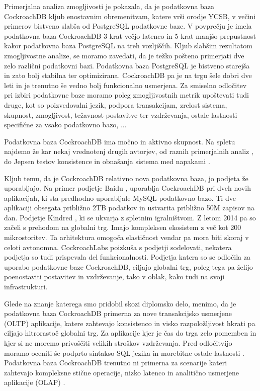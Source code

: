 \documentclass[a4paper, 12pt]{book}
\begin{document}
Primerjalna analiza zmogljivosti je pokazala, da je podatkovna baza Cock\-roachDB kljub enostavnim obremenitvam, katere vrši orodje YCSB, v večini primerov bistveno slabša od PostgreSQL podatkovne baze. V povprečju je imela podatkovna baza Cock\-roachDB 3 krat večjo latenco in 5 krat manjšo prepustnost kakor podatkovna baza PostgreSQL na treh vozljiščih.
Kljub slabšim rezultatom zmogljivostne analize, se moramo zavedati, da je težko pošteno primerjati dve zelo različni podatkovni bazi. Podatkovna baza PostgreSQL je bistveno starejša in zato bolj stabilna ter optimizirana. CockroachDB pa je na trgu šele dobri dve leti in je trenutno še vedno bolj funkcionalno usmerjena. Za smiselno odločitev pri izbiri podatkovne baze moramo poleg zmogljivostnih metrik upoštevati tudi druge, kot so poizvedovalni jezik, podpora transakcijam, zrelost sistema, skupnost, zmogljivost, težavnost postavitve ter vzdrževanja, ostale lastnosti specifične za vsako podatkovno bazo, ...

Podatkovna baza CockroachDB ima močno in aktivno skupnost. Na spletu najdemo že kar nekaj vrednotenj drugih avtorjev, od raznih primerjalnih analiz \cite{kaur2017performance, Benchmarking-GCS-CRDB-NuoDB, CRDB-tpcc-vs-aurora, CRDB-2017}, do Jepsen testov konsistence in obnašanja sistema med napakami \cite{CRDB-jepsen, CRDB-jepsen-diy}.

Kljub temu, da je CockroachDB relativno nova podatkovna baza, jo podjeta že uporabljajo. Na primer podjetje Baidu \cite{crdb-baidu}, uporablja CockroachDB pri dveh novih aplikacijah, ki sta predhodno uporabljale MySQL podatkovno bazo. Ti dve aplikaciji obsegata približno 2TB podatkov in ustvarita približno 50M zapisov na dan. Podjetje Kindred \cite{crdb-kindred}, ki se ukvarja z spletnim igralništvom. Z letom 2014 pa so začeli s prehodom na globalni trg. Imajo kompleksen ekosistem z več kot 200 mikrostoritev. Ta arhitektura omogoča elastičnost vendar pa mora biti skoraj v celoti avtonomna. CockroachLabs poizkuša s podjetji sodelovati, nekatera podjetja so tudi prispevala del funkcionalnosti. Podjetja katera so se odločila za uporabo podatkovne baze CockroachDB, ciljajo globalni trg, poleg tega pa želijo poenostaviti postavitev in vzdrževanje, tako v oblak, kako tudi na svoji infrastrukturi.

Glede na znanje katerega smo pridobil skozi diplomsko delo, menimo, da je podatkovna baza CockroachDB primerna za nove transakcijsko usmerjene (OLTP) aplikacije, katere zahtevajo konsistenco in visko razpoložljivost hkrati pa ciljajo hitrorastoč globalni trg. Za aplikacije kjer je čas do trga zelo pomemben in kjer si ne moremo privoščiti velikih stroškov vzdrževanja. Pred odločitvijo moramo oceniti še podprto sintakso SQL jezika \cite{CRDB-sql-features} in morebitne ostale lastnosti \cite{CRDB-limitations}. Podatkovna baza CockroachDB trenutno ni primerna za scenarije kateri zahtevajo kompleksne stične operacije, nizko latenco in analitično usmerjene aplikacije (OLAP) \cite{CRDB-FAQ}.
\end{document}
